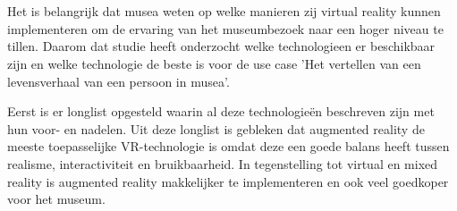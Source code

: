 
%
%

%



\chapter*{}
Het is belangrijk dat musea weten op welke manieren zij virtual reality kunnen implementeren om de ervaring van het museumbezoek naar een hoger niveau te tillen.
Daarom dat studie heeft onderzocht welke technologieen er beschikbaar zijn en welke technologie de beste is voor de use case 'Het vertellen van een levensverhaal van een persoon in musea'.

Eerst is er longlist opgesteld waarin al deze technologieën beschreven zijn met hun voor- en nadelen.
Uit deze longlist is gebleken dat augmented reality de meeste toepasselijke VR-technologie is omdat deze een goede balans heeft tussen realisme, interactiviteit en bruikbaarheid.
In tegenstelling tot virtual en mixed reality is augmented reality makkelijker te implementeren en ook veel goedkoper voor het museum.

